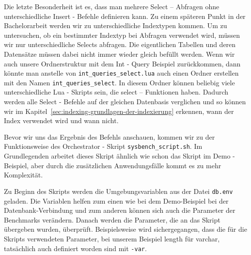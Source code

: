 \label{itm:mehrere_selects}
Die letzte Besonderheit ist es, dass man mehrere Select – Abfragen ohne unterschiedliche Insert - Befehle definieren kann.
Zu einem späteren Punkt in der Bachelorarbeit werden wir zu unterschiedliche Indextypen kommen.
Um zu untersuchen, ob ein bestimmter Indextyp bei Abfragen verwendet wird, müssen wir nur unterschiedliche Selects abfragen.
Die eigentlichen Tabellen und deren Datensätze müssen dabei nicht immer wieder gleich befüllt werden.
Wenn wir auch unsere Ordnerstruktur mit dem Int - Query Beispiel zurückkommen, dann könnte man anstelle von \texttt{int\_queries\_select.lua} auch einen Ordner erstellen mit den Namen \texttt{int\_queries\_select}.
In diesem Ordner können beliebig viele unterschiedliche Lua - Skripts sein, die select – Funktionen haben.
Dadurch werden alle Select - Befehle auf der gleichen Datenbasis verglichen und so können wir im Kapitel~\ref{sec:indexing-grundlagen-der-indexierung} erkennen, wann der Index verwendet wird und wann nicht.

Bevor wir uns das Ergebnis des Befehls anschauen, kommen wir zu der Funktionsweise des Orchestrator - Skript \texttt{sysbench\_script.sh}.
Im Grundlegenden arbeitet dieses Skript ähnlich wie schon das Skript im Demo - Beispiel, aber durch die zusätzlichen Anwendungsfälle kommt es zu mehr Komplexität.

Zu Beginn des Skripts werden die Umgebungsvariablen aus der Datei \texttt{db.env} geladen.
Die Variablen helfen zum einen wie bei dem Demo-Beispiel bei der Datenbank-Verbindung und zum anderen können sich auch die Parameter der Benchmarks verändern.
Danach werden die Parameter, die an das Skript übergeben wurden, überprüft.
Beispielsweise wird sichergegangen, dass die für die Skripts verwendeten Parameter, bei unserem Beispiel length für varchar, tatsächlich auch definiert worden sind mit \texttt{-var}.

